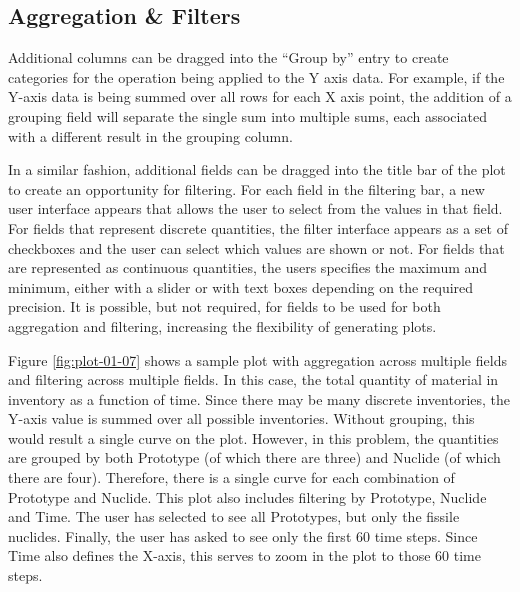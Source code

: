 \subsection{Aggregation \& Filters}

Additional columns can be dragged into the ``Group by'' entry to create
categories for the operation being applied to the Y axis data.  For example,
if the Y-axis data is being summed over all rows for each X axis point, the
addition of a grouping field will separate the single sum into multiple sums,
each associated with a different result in the grouping column.

In a similar fashion, additional fields can be dragged into the title bar of
the plot to create an opportunity for filtering.  For each field in the
filtering bar, a new user interface appears that allows the user to select
from the values in that field.  For fields that represent discrete quantities,
the filter interface appears as a set of checkboxes and the user can select
which values are shown or not.  For fields that are represented as continuous
quantities, the users specifies the maximum and minimum, either with a slider
or with text boxes depending on the required precision.  It is possible, but
not required, for fields to be used for both aggregation and filtering,
increasing the flexibility of generating plots.

Figure \ref{fig:plot-01-07} shows a sample plot with aggregation across
multiple fields and filtering across multiple fields.  In this case, the total
quantity of material in inventory as a function of time.  Since there may be
many discrete inventories, the Y-axis value is summed over all possible
inventories.  Without grouping, this would result a single curve on the plot.
However, in this problem, the quantities are grouped by both Prototype (of
which there are three) and Nuclide (of which there are four).  Therefore,
there is a single curve for each combination of Prototype and Nuclide.  This
plot also includes filtering by Prototype, Nuclide and Time.  The user has
selected to see all Prototypes, but only the fissile nuclides.  Finally, the
user has asked to see only the first 60 time steps.  Since Time also defines
the X-axis, this serves to zoom in the plot to those 60 time steps.


